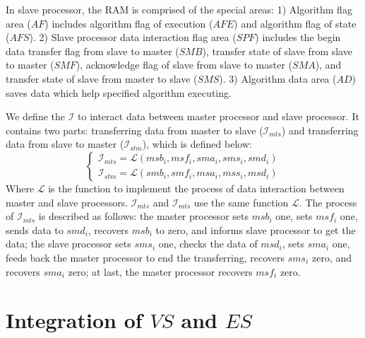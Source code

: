 \documentclass[journal,UTF8]{IEEEtran}
\begin{document}
In slave processor, the RAM is comprised of the special areas: 1) Algorithm flag area ($AF$) includes algorithm flag of execution ($AFE$) and algorithm flag of state ($AFS$). 2) Slave processor data interaction flag area ($SPF$) includes the begin data transfer flag from slave to master ($SMB$), transfer state of slave from slave to master ($SMF$), acknowledge flag of slave from slave to master ($SMA$), and transfer state of slave from master to slave ($SMS$). 3) Algorithm data area ($AD$) saves data which help specified algorithm executing.

 We define the $\mathcal{I}$ to interact data between master processor and slave processor. It contains two parts: transferring data from master to slave ($\mathcal{I}_{mts}$) and transferring data from slave to master ($\mathcal{I}_{stm}$), which is defined below:
 \begin{equation}
 \left\{
 \begin{array}{l}
 \mathcal{I}_{mts} = \mathcal{L} (msb_i,msf_i,sma_i,sms_i,smd_i)\\
 \mathcal{I}_{stm} = \mathcal{L} (smb_i,smf_i,msa_i,mss_i,msd_i)
 \end{array}
 \right.
 \end{equation}
 Where $\mathcal{L}$ is the function to implement the process of data interaction between master and slave processors. $\mathcal{I}_{mts}$ and $\mathcal{I}_{mts}$ use the same function $\mathcal{L}$. The process of $\mathcal{I}_{mts}$ is described as follows: the master processor sets $msb_i$ one, sets $msf_i$ one, sends data to $smd_i$,  recovers $msb_i$ to zero, and informs slave processor to get the data; the slave processor sets $sms_i$ one, checks the data of $msd_i$, sets $sma_i$ one, feeds back the master processor to end the transferring, recovers $sms_i$ zero, and recovers $sma_i$ zero; at last, the master processor recovers $msf_i$ zero.     
 

\section{Integration of $VS$ and $ES$}
\label{Integration}
\end{document}
